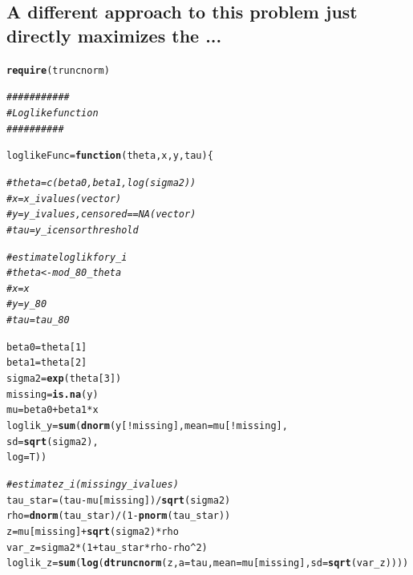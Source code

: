 \documentclass{article}\usepackage[]{graphicx}\usepackage[]{color}
\makeatletter
\newcommand{\hlnum}[1]{\textcolor[rgb]{0.686,0.059,0.569}{#1}}%
\newcommand{\hlcom}[1]{\textcolor[rgb]{0.678,0.584,0.686}{\textit{#1}}}%
\newcommand{\hlopt}[1]{\textcolor[rgb]{0,0,0}{#1}}%
\newcommand{\hlstd}[1]{\textcolor[rgb]{0.345,0.345,0.345}{#1}}%
\newcommand{\hlkwa}[1]{\textcolor[rgb]{0.161,0.373,0.58}{\textbf{#1}}}%
\newcommand{\hlkwb}[1]{\textcolor[rgb]{0.69,0.353,0.396}{#1}}%
\newcommand{\hlkwc}[1]{\textcolor[rgb]{0.333,0.667,0.333}{#1}}%
\newcommand{\hlkwd}[1]{\textcolor[rgb]{0.737,0.353,0.396}{\textbf{#1}}}%
\newenvironment{kframe}{%
 \def\at@end@of@kframe{}%
 \ifinner\ifhmode%
  \def\at@end@of@kframe{\end{minipage}}%
  \begin{minipage}{\columnwidth}%
 \fi\fi%
 \def\FrameCommand##1{\hskip\@totalleftmargin \hskip-\fboxsep
 \colorbox{shadecolor}{##1}\hskip-\fboxsep
     \hskip-\linewidth \hskip-\@totalleftmargin \hskip\columnwidth}%
 \MakeFramed {\advance\hsize-\width
   \@totalleftmargin\z@ \linewidth\hsize
   \@setminipage}}%
 {\par\unskip\endMakeFramed%
 \at@end@of@kframe}
\newenvironment{knitrout}{}{} %
\makeatother
\begin{document}
\subsection{A different approach to this problem just directly maximizes the ...}

\begin{knitrout}
\color{fgcolor}\begin{kframe}
\begin{alltt}
\hlkwd{require}\hlstd{(truncnorm)}


\hlcom{###########}
\hlcom{# Loglike function}
\hlcom{##########}

\hlstd{loglikeFunc} \hlkwb{=} \hlkwa{function}\hlstd{(}\hlkwc{theta}\hlstd{,} \hlkwc{x}\hlstd{,} \hlkwc{y}\hlstd{,} \hlkwc{tau}\hlstd{) \{}

    \hlcom{#theta = c(beta0, beta1, log(sigma2))}
    \hlcom{#x = x_i values (vector)}
    \hlcom{#y = y_i values, censored==NA (vector)}
    \hlcom{#tau = y_i censor threshold}

    \hlcom{#estimate loglik for y_i}
    \hlcom{#theta <- mod_80_theta}
    \hlcom{#x = x}
    \hlcom{#y = y_80}
    \hlcom{#tau = tau_80}

    \hlstd{beta0} \hlkwb{=} \hlstd{theta[}\hlnum{1}\hlstd{]}
    \hlstd{beta1} \hlkwb{=} \hlstd{theta[}\hlnum{2}\hlstd{]}
    \hlstd{sigma2} \hlkwb{=} \hlkwd{exp}\hlstd{(theta[}\hlnum{3}\hlstd{])}
    \hlstd{missing} \hlkwb{=} \hlkwd{is.na}\hlstd{(y)}
    \hlstd{mu} \hlkwb{=} \hlstd{beta0} \hlopt{+} \hlstd{beta1} \hlopt{*} \hlstd{x}
    \hlstd{loglik_y} \hlkwb{=} \hlkwd{sum}\hlstd{(}\hlkwd{dnorm}\hlstd{(y[}\hlopt{!}\hlstd{missing],} \hlkwc{mean} \hlstd{= mu[}\hlopt{!}\hlstd{missing],}
                          \hlkwc{sd} \hlstd{=} \hlkwd{sqrt}\hlstd{(sigma2),}
                          \hlkwc{log} \hlstd{= T))}

    \hlcom{#estimate z_i (missing y_i values)}
    \hlstd{tau_star} \hlkwb{=} \hlstd{(tau} \hlopt{-} \hlstd{mu[missing])} \hlopt{/} \hlkwd{sqrt}\hlstd{(sigma2)}
    \hlstd{rho} \hlkwb{=} \hlkwd{dnorm}\hlstd{(tau_star)} \hlopt{/} \hlstd{(}\hlnum{1} \hlopt{-} \hlkwd{pnorm}\hlstd{(tau_star))}
    \hlstd{z} \hlkwb{=} \hlstd{mu[missing]} \hlopt{+} \hlkwd{sqrt}\hlstd{(sigma2)} \hlopt{*} \hlstd{rho}
    \hlstd{var_z} \hlkwb{=} \hlstd{sigma2} \hlopt{*} \hlstd{(}\hlnum{1} \hlopt{+} \hlstd{tau_star} \hlopt{*} \hlstd{rho} \hlopt{-} \hlstd{rho}\hlopt{^}\hlnum{2}\hlstd{)}
    \hlstd{loglik_z} \hlkwb{=} \hlkwd{sum}\hlstd{(}\hlkwd{log}\hlstd{(}\hlkwd{dtruncnorm}\hlstd{(z,} \hlkwc{a} \hlstd{= tau,} \hlkwc{mean} \hlstd{= mu[missing],} \hlkwc{sd} \hlstd{=} \hlkwd{sqrt}\hlstd{(var_z))))}


\end{alltt}
\end{kframe}
\end{knitrout}
\end{document}
